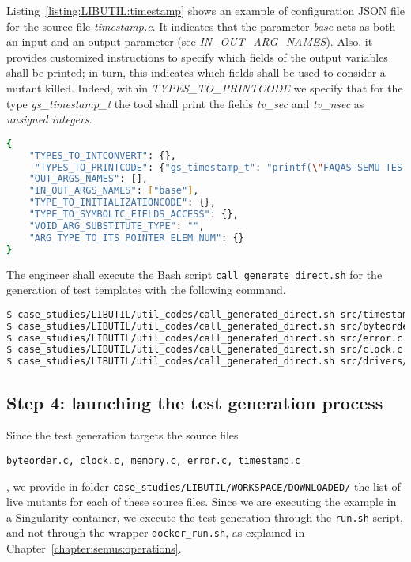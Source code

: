 Listing~\ref{listing:LIBUTIL:timestamp} shows an example of configuration JSON file for the source file \emph{timestamp.c}. It indicates that the parameter \emph{base} acts as both an input and an output parameter (see \emph{IN\_OUT\_ARG\_NAMES}). Also, it provides customized instructions to specify which fields of the output variables shall be printed; in turn, this indicates which fields shall be used to consider a mutant killed. Indeed, within \emph{TYPES\_TO\_PRINTCODE} we specify that for the type \emph{gs\_timestamp\_t} the tool shall print the fields \emph{tv\_sec} and \emph{tv\_nsec} as \emph{unsigned integers}.

\begin{lstlisting}[language=bash,label=listing:LIBUTIL:timestamp,caption=JSON configuration file for timestamp.c.]
{
    "TYPES_TO_INTCONVERT": {},
     "TYPES_TO_PRINTCODE": {"gs_timestamp_t": "printf(\"FAQAS-SEMU-TEST-OUTPUT: result_faqas_semu = tv_sec: %u, tv_nsec: %u\\n\", {}.tv_sec, {}.tv_nsec);"},
    "OUT_ARGS_NAMES": [],
    "IN_OUT_ARGS_NAMES": ["base"],
    "TYPE_TO_INITIALIZATIONCODE": {},
    "TYPE_TO_SYMBOLIC_FIELDS_ACCESS": {},
    "VOID_ARG_SUBSTITUTE_TYPE": "",
    "ARG_TYPE_TO_ITS_POINTER_ELEM_NUM": {}
}
\end{lstlisting}

The engineer shall execute the Bash script \texttt{call\_generate\_direct.sh} for the generation of test templates with the following command.

\begin{lstlisting}[language=bash]
$ case_studies/LIBUTIL/util_codes/call_generated_direct.sh src/timestamp.c
$ case_studies/LIBUTIL/util_codes/call_generated_direct.sh src/byteorder.c
$ case_studies/LIBUTIL/util_codes/call_generated_direct.sh src/error.c
$ case_studies/LIBUTIL/util_codes/call_generated_direct.sh src/clock.c
$ case_studies/LIBUTIL/util_codes/call_generated_direct.sh src/drivers/sys/memory.c
\end{lstlisting}

\subsection{Step 4: launching the test generation process}

Since the test generation targets the source files \begin{small}\texttt{byteorder.c, clock.c, memory.c, error.c, timestamp.c}\end{small}, we provide in folder \texttt{case\_studies/LIBUTIL/WORKSPACE/DOWNLOADED/} the list of live mutants for each of these source files.
Since we are executing the example in a Singularity container, we execute the test generation through the \texttt{run.sh} script, and not through the wrapper \texttt{docker\_run.sh}, as explained in Chapter~\ref{chapter:semus:operations}.

